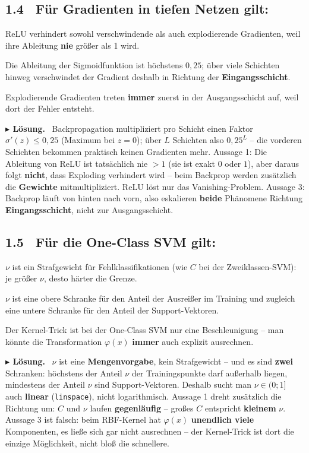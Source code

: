 \documentclass[10pt,a4paper]{article}
\newcommand{\mcbox}{\raisebox{-1pt}{\fbox{\rule{0pt}{7pt}\rule{7pt}{0pt}}}\hspace{6pt}}
\newcommand{\mcja}{\raisebox{-1pt}{{\fboxrule0.9pt\fcolorbox{loesfarbe}{white}{%
  \rule{0pt}{7pt}\makebox[7pt][c]{\color{loesfarbe}\scriptsize\bfseries X}}}}\hspace{6pt}}
\newenvironment{loes}%
  {\par\vspace{2pt}\begingroup\small\noindent\textbf{\color{loesfarbe}$\blacktriangleright$ Lösung.}\ }%
  {\endgroup\par\vspace{5pt}}
\begin{document}
\subsection*{1.4 \ Für Gradienten in tiefen Netzen gilt:}
\mcbox ReLU verhindert sowohl verschwindende als auch explodierende Gradienten, weil ihre
Ableitung \textbf{nie} größer als 1 wird.

\mcja Die Ableitung der Sigmoidfunktion ist höchstens $0{,}25$; über viele Schichten hinweg
verschwindet der Gradient deshalb in Richtung der \textbf{Eingangsschicht}.

\mcbox Explodierende Gradienten treten \textbf{immer} zuerst in der Ausgangsschicht auf, weil
dort der Fehler entsteht.

\begin{loes}
Backpropagation multipliziert pro Schicht einen Faktor $\sigma'(z) \le 0{,}25$ (Maximum bei
$z=0$); über $L$ Schichten also $0{,}25^L$ -- die vorderen Schichten bekommen praktisch keinen
Gradienten mehr.
Aussage 1: Die Ableitung von ReLU ist tatsächlich nie $>1$ (sie ist exakt $0$ oder $1$), aber
daraus folgt \textbf{nicht}, dass Exploding verhindert wird -- beim Backprop werden zusätzlich
die \textbf{Gewichte} mitmultipliziert. ReLU löst nur das Vanishing-Problem.
Aussage 3: Backprop läuft von hinten nach vorn, also eskalieren \textbf{beide} Phänomene Richtung
\textbf{Eingangsschicht}, nicht zur Ausgangsschicht.
\end{loes}

\subsection*{1.5 \ Für die One-Class SVM gilt:}
\mcbox $\nu$ ist ein Strafgewicht für Fehlklassifikationen (wie $C$ bei der Zweiklassen-SVM):
je größer $\nu$, desto härter die Grenze.

\mcja $\nu$ ist eine obere Schranke für den Anteil der Ausreißer im Training und zugleich eine
untere Schranke für den Anteil der Support-Vektoren.

\mcbox Der Kernel-Trick ist bei der One-Class SVM nur eine Beschleunigung -- man könnte die
Transformation $\varphi(x)$ \textbf{immer} auch explizit ausrechnen.

\begin{loes}
$\nu$ ist eine \textbf{Mengenvorgabe}, kein Strafgewicht -- und es sind \textbf{zwei} Schranken:
höchstens der Anteil $\nu$ der Trainingspunkte darf außerhalb liegen, mindestens der Anteil $\nu$
sind Support-Vektoren. Deshalb sucht man $\nu \in (0;1]$ auch \textbf{linear} (\texttt{linspace}),
nicht logarithmisch.
Aussage 1 dreht zusätzlich die Richtung um: $C$ und $\nu$ laufen \textbf{gegenläufig} -- großes $C$
entspricht \textbf{kleinem} $\nu$.
Aussage 3 ist falsch: beim RBF-Kernel hat $\varphi(x)$ \textbf{unendlich viele} Komponenten, es
ließe sich gar nicht ausrechnen -- der Kernel-Trick ist dort die einzige Möglichkeit, nicht bloß
die schnellere.
\end{loes}
\end{document}
